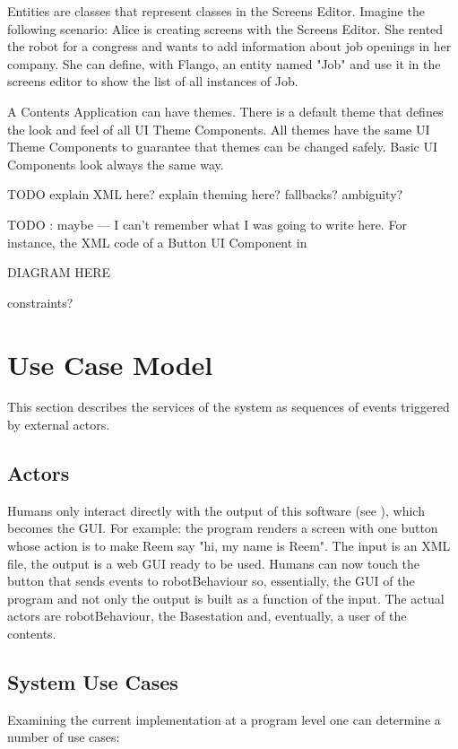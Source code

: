 Entities are classes that represent classes in the Screens Editor. 
Imagine the following scenario: Alice is creating screens with the Screens Editor.
She rented the robot for a congress and wants to add information about job openings in her company.
She can define, with Flango, an entity named "Job" and use it in the screens editor to show the list of all instances of Job.

A Contents Application can have themes.
There is a default theme that defines the look and feel of all UI Theme Components.
All themes have the same UI Theme Components to guarantee that themes can be changed safely.
Basic UI Components look always the same way.

TODO explain XML here? explain theming here? fallbacks? ambiguity?

TODO : maybe --- I can't remember what I was going to write here.
For instance, the \ac{XML} code of a Button UI Component in 



DIAGRAM HERE


constraints?

\section{Use Case Model}
This section describes the services of the system as sequences of events triggered by external actors.

\subsection{Actors}
Humans only interact directly with the output of this software (see ), which becomes the \ac{GUI}.
For example: the program renders a screen with one button whose action is to make Reem say "hi, my name is Reem".
The input is an \ac{XML} file, the output is a web \ac{GUI} ready to be used.
Humans can now touch the button that sends events to robotBehaviour so, essentially, the \ac{GUI} of the program and not only the output is built as a function of the input.
The actual actors are robotBehaviour, the Basestation and, eventually, a user of the contents.


\subsection{System Use Cases}
Examining the current implementation at a program level one can determine a number of use cases:


